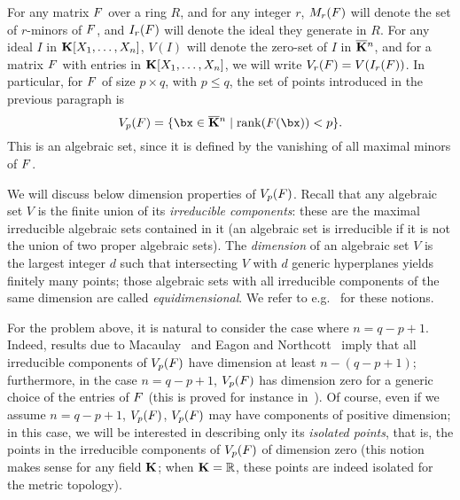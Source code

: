 \documentclass[12pt]{article}
\newtheorem{pbm}{Problem}
\begin{document}
For any matrix ${F}$ over a ring $R$, and for any integer $r$,
$M_r({F})$ will denote the set of $r$-minors of ${F}$, and $I_r({F})$
will denote the ideal they generate in $R$. For any ideal $I$ in $\mathbf{K}[X_1,\dots,X_n]$, $V(I)$ will denote the
zero-set of $I$ in $\overline{\mathbf{K}}{}^n$, and for a matrix ${F}$ with entries in 
$\mathbf{K}[X_1,\dots,X_n]$, we will write $V_r({F})=V(I_r({F}))$. In particular,
for ${F}$ of size $p \times q$, with $p \le q$, the set of points
introduced in the previous paragraph is
$$\VpF{p}{\mF}=\{\bx \in \KKbar{}^n \mid \mathrm{rank}(\mF({\bx})) < p\}.$$
This is an algebraic set, since it is defined by the vanishing of
all maximal minors of ${F}$. 

We will discuss below dimension properties of $V_{p}({F})$.  Recall
that any algebraic set $V$ is the finite union of its
\emph{irreducible components}: these are the maximal irreducible
algebraic sets contained in it (an algebraic set is irreducible if it
is not the union of two proper algebraic sets). The {\em dimension} of
an algebraic set $V$ is the largest integer $d$ such that intersecting
$V$ with $d$ generic hyperplanes yields finitely many points; those
algebraic sets with all irreducible components of the same dimension
are called {\em equidimensional}. We refer to
e.g.~\cite{Shafarevich77} for these notions.

For the problem above, it is natural to consider the case where $n =
q-p+1$.  Indeed, results due to Macaulay~\cite{Macaulay16} and Eagon
and Northcott~\cite{EN62} imply that all irreducible components of
$V_{p}({F})$ have dimension at least $n-(q-p+1)$; furthermore, in
the case $n = q-p+1$, $V_{p}({F})$ has dimension zero for a generic
choice of the entries of ${F}$ (this is proved for instance
in~\cite{Spa14}). Of course, even if we assume $n = q-p+1$,
$V_{p}({F})$, $V_{p}({F})$ may have components of positive
dimension; in this case, we will be interested in describing only its
{\em isolated points}, that is, the points in the irreducible
components of $V_{p}({F})$ of dimension zero (this notion makes
sense for any field $\mathbf{K}$; when $\mathbf{K}=\mathbb{R}$, these points are
indeed isolated for the metric topology).


\end{document}

